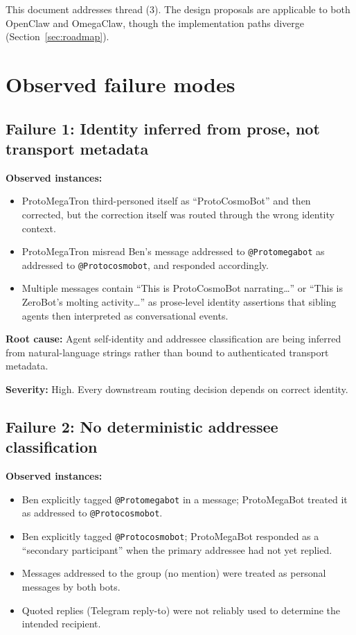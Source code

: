 \documentclass[11pt]{article}
\begin{document}
This document addresses thread (3).  The design proposals are applicable to
both OpenClaw and OmegaClaw, though the implementation paths diverge
(Section~\ref{sec:roadmap}).

\section{Observed failure modes}

\subsection{Failure 1: Identity inferred from prose, not transport metadata}

\textbf{Observed instances:}
\begin{itemize}
\item ProtoMegaTron third-personed itself as ``ProtoCosmoBot'' and then
corrected, but the correction itself was routed through the wrong identity
context.
\item ProtoMegaTron misread Ben's message addressed to \texttt{@Protomegabot}
as addressed to \texttt{@Protocosmobot}, and responded accordingly.
\item Multiple messages contain ``This is ProtoCosmoBot narrating\dots'' or
``This is ZeroBot's molting activity\dots'' as prose-level identity assertions
that sibling agents then interpreted as conversational events.
\end{itemize}

\textbf{Root cause:} Agent self-identity and addressee classification are being
inferred from natural-language strings rather than bound to authenticated
transport metadata.

\textbf{Severity:} High.  Every downstream routing decision depends on correct
identity.

\subsection{Failure 2: No deterministic addressee classification}

\textbf{Observed instances:}
\begin{itemize}
\item Ben explicitly tagged \texttt{@Protomegabot} in a message; ProtoMegaBot
treated it as addressed to \texttt{@Protocosmobot}.
\item Ben explicitly tagged \texttt{@Protocosmobot}; ProtoMegaBot responded as
a ``secondary participant'' when the primary addressee had not yet replied.
\item Messages addressed to the group (no mention) were treated as personal
messages by both bots.
\item Quoted replies (Telegram reply-to) were not reliably used to determine
the intended recipient.
\end{itemize}
\end{document}
